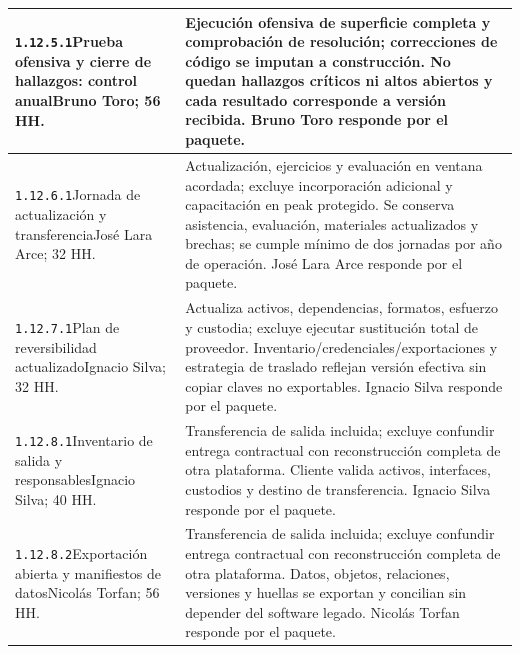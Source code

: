 \begin{longtable}{L{52mm}L{91mm}}
\texttt{1.\allowbreak{}12.\allowbreak{}5.\allowbreak{}1}\newline Prueba ofensiva y cierre de hallazgos: control anual\newline Bruno Toro; 56 HH. & Ejecución ofensiva de superficie completa y comprobación de resolución; correcciones de código se imputan a construcción. No quedan hallazgos críticos ni altos abiertos y cada resultado corresponde a versión recibida. Bruno Toro responde por el paquete.\\\hline
\texttt{1.\allowbreak{}12.\allowbreak{}6.\allowbreak{}1}\newline Jornada de actualización y transferencia\newline José Lara Arce; 32 HH. & Actualización, ejercicios y evaluación en ventana acordada; excluye incorporación adicional y capacitación en peak protegido. Se conserva asistencia, evaluación, materiales actualizados y brechas; se cumple mínimo de dos jornadas por año de operación. José Lara Arce responde por el paquete.\\\hline
\texttt{1.\allowbreak{}12.\allowbreak{}7.\allowbreak{}1}\newline Plan de reversibilidad actualizado\newline Ignacio Silva; 32 HH. & Actualiza activos, dependencias, formatos, esfuerzo y custodia; excluye ejecutar sustitución total de proveedor. Inventario/credenciales/exportaciones y estrategia de traslado reflejan versión efectiva sin copiar claves no exportables. Ignacio Silva responde por el paquete.\\\hline
\texttt{1.\allowbreak{}12.\allowbreak{}8.\allowbreak{}1}\newline Inventario de salida y responsables\newline Ignacio Silva; 40 HH. & Transferencia de salida incluida; excluye confundir entrega contractual con reconstrucción completa de otra plataforma. Cliente valida activos, interfaces, custodios y destino de transferencia. Ignacio Silva responde por el paquete.\\\hline
\texttt{1.\allowbreak{}12.\allowbreak{}8.\allowbreak{}2}\newline Exportación abierta y manifiestos de datos\newline Nicolás Torfan; 56 HH. & Transferencia de salida incluida; excluye confundir entrega contractual con reconstrucción completa de otra plataforma. Datos, objetos, relaciones, versiones y huellas se exportan y concilian sin depender del software legado. Nicolás Torfan responde por el paquete.\\\hline

\end{longtable}
